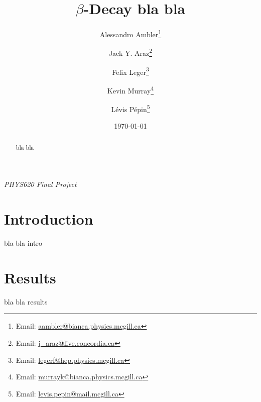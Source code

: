 \documentclass[letterpaper,aps,prd,preprint,showpacs,nofootinbib,superscriptaddress]{revtex4-1}
\begin{document}
\preprint{}
\vskip 20pt
\title[]{$ \beta $-Decay bla bla}
\begin{center}{\it PHYS620 Final Project} 
\end{center}
\author{Alessandro Ambler\footnote{Email: \href{aambler@bianca.physics.mcgill.ca}{aambler@bianca.physics.mcgill.ca}}}

\author{Jack Y. Araz\footnote{Email: \href{j_araz@live.concordia.ca}{j\_araz@live.concordia.ca}}}

\author{Felix Leger\footnote{Email: \href{legerf@hep.physics.mcgill.ca}{legerf@hep.physics.mcgill.ca}}}

\author{Kevin Murray\footnote{Email: \href{murrayk@bianca.physics.mcgill.ca}{murrayk@bianca.physics.mcgill.ca}}}

\author{L\'{e}vis P\'{e}pin\footnote{Email: \href{levis.pepin@mail.mcgill.ca}{levis.pepin@mail.mcgill.ca}}}

\date{\today}%

\begin{abstract}
bla bla
\end{abstract}

\maketitle

\section{Introduction}\label{sec:intro}
bla bla intro


\section{Results}\label{sec:results}
bla bla results
\end{document}
